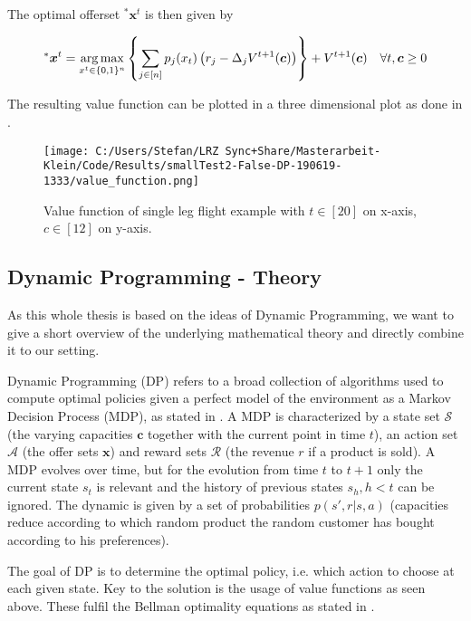 The optimal offerset $^*\boldsymbol{x}^t$ is then given by

\begin{align}
	^*\boldsymbol{x}^t = \operatorname*{arg\,max}_{x^t \in \{0,1\}^n}\left\{ \sum_{j \in [n]} p_j(x_t) \left( r_j - \Delta_j V^{t+1}(\boldsymbol{c}) \right) \right\} + V^{t+1}(\boldsymbol{c})\quad \forall t, \boldsymbol{c} \geq 0\label{eq-DP-optOffer}
\end{align}

The resulting value function can be plotted in a three dimensional plot as done in .

\begin{figure}
\caption{\label{fig-valueFunc} Value function of single leg flight example with $t \in [20]$ on x-axis, $c \in [12]$ on y-axis.}
\texttt{[image: C:/Users/Stefan/LRZ Sync+Share/Masterarbeit-Klein/Code/Results/smallTest2-False-DP-190619-1333/value\_function.png]}
\end{figure}

\subsection{Dynamic Programming - Theory}

As this whole thesis is based on the ideas of Dynamic Programming, we want to give a short overview of the underlying mathematical theory and directly combine it to our setting.

Dynamic Programming (DP) refers to a broad collection of algorithms used to compute optimal policies given a perfect model of the environment as a Markov Decision Process (MDP), as stated in \cite{Sutton.2018}. A MDP is characterized by a state set $\mathcal{S}$ (the varying capacities $\mathbf{c}$ together with the current point in time $t$), an action set $\mathcal{A}$ (the offer sets $\mathbf{x}$) and reward sets $\mathcal{R}$ (the revenue $r$ if a product is sold). A MDP evolves over time, but for the evolution from time $t$ to $t+1$ only the current state $s_t$ is relevant and the history of previous states $s_h, h<t$ can be ignored. The dynamic is given by a set of probabilities $p(s', r | s, a)$ (capacities reduce according to which random product the random customer has bought according to his preferences). 

The goal of DP is to determine the optimal policy, i.e. which action to choose at each given state. Key to the solution is the usage of value functions as seen above. These fulfil the Bellman optimality equations as stated in . 

